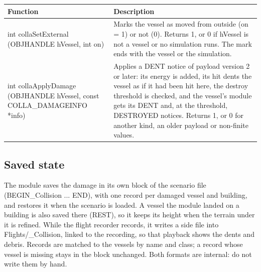 \documentclass[Orbiter Developer Manual.tex]{subfiles}
\begin{document}
\begin{sloppypar}
	\begin{longtable}{ |p{}|p{}| }
	\hline\rule{0pt}{2ex}
	\textbf{Function} & \textbf{Description}\\
	\hline\rule{0pt}{2ex}
	int collaSetExternal (OBJHANDLE hVessel, int on) & Marks the vessel as moved from outside (on = 1) or not (0). Returns 1, or 0 if hVessel is not a vessel or no simulation runs. The mark ends with the vessel or the simulation.\\
	\hline\rule{0pt}{2ex}
	int collaApplyDamage (OBJHANDLE hVessel, const COLLA\_DAMAGEINFO *info) & Applies a DENT notice of payload version 2 or later: its energy is added, its hit dents the vessel as if it had been hit here, the destroy threshold is checked, and the vessel's module gets its DENT and, at the threshold, DESTROYED notices. Returns 1, or 0 for another kind, an older payload or non-finite values.\\
	\hline
	\end{longtable}


\subsection{Saved state}
The module saves the damage in its own block of the scenario file (BEGIN\_Collision ... END), with one record per damaged vessel and building, and restores it when the scenario is loaded. A vessel the module landed on a building is also saved there (REST), so it keeps its height when the terrain under it is refined. While the flight recorder records, it writes a side file into Flights/\_Collision, linked to the recording, so that playback shows the dents and debris. Records are matched to the vessels by name and class; a record whose vessel is missing stays in the block unchanged. Both formats are internal: do not write them by hand.

\end{sloppypar}
\end{document}
